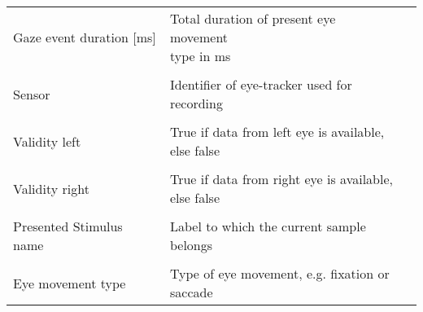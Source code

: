 \begin{table}[ht!]
{\begin{tabular}{lll}
        Gaze event duration [ms]      &         \makecell{Total duration of present eye movement\\ type in ms} &           \\[-10pt]\\
        Sensor                        &         \makecell{Identifier of eye-tracker used for\\ recording} &           \\[-10pt]\\
        Validity left                 &         \makecell{True if data from left eye is available,\\ else false} &           \\[-10pt]\\
        Validity right                &         \makecell{True if data from right eye is available,\\ else false} &           \\[-10pt]\\
        Presented Stimulus name       &         \makecell{Label to which the current sample\\ belongs} &          \\[-10pt]\\
        Eye movement type             &         \makecell{Type of eye movement, e.g. fixation or\\ saccade} &           \\
        \bottomrule
        \end{tabular}
    }
\end{table}